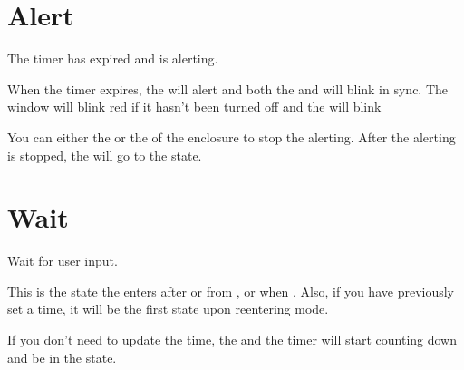\section{Alert} 

The timer has expired and is alerting.

\par\medskip

When the timer expires, the  will alert and both the  and 
will blink in sync. The  window will blink red if it hasn't been turned
off and the  will blink

\begin{figure}[H]
\centering
\end{figure}

You can either  the  or  the  of the enclosure to
stop the alerting.  After the alerting is stopped, the  will go to the
 state.


\section{Wait} 

Wait for user input.

\par\medskip

This is the state the  enters after  or from ,
 or  when .  Also, if you have previously set a
time, it will be the first state upon reentering  mode.

\par\medskip

If you don't need to update the time,  the  and the timer will
start counting down and be in the  state.


